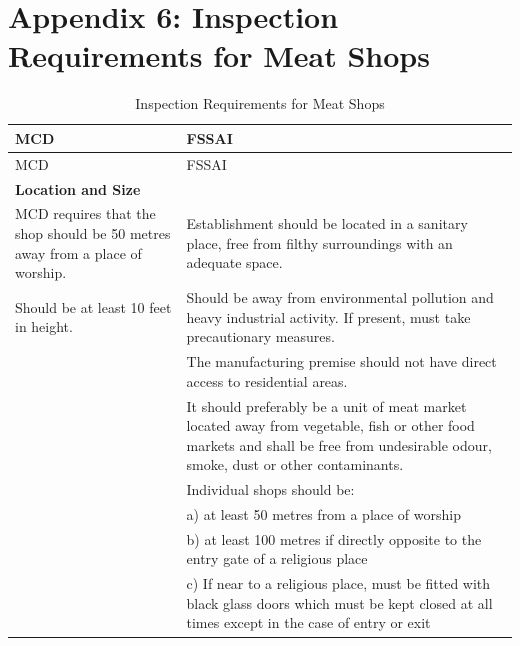 \documentclass[a4paper, 12pt, twoside]{article}
\newcommand\tabitem{\makebox[1em][r]{\textbullet~}}
\begin{document}
\newpage
\section*{Appendix 6: Inspection Requirements for Meat Shops}
\begin{longtable}[l]{>{\raggedright}p{6.5cm}>{\raggedright\arraybackslash}p{8.5cm}}
\caption{Inspection Requirements for Meat Shops} \\
\endfirsthead
\toprule
MCD & FSSAI\\
\midrule
\endhead
\midrule
MCD & FSSAI\\
\midrule
\textbf{Location and Size}	&	 \\
    \midrule

	\tabitem MCD requires that the shop should be 50 metres away from a place of worship.	&
	\tabitem Establishment should be located in a sanitary place, free from filthy surroundings with an adequate space.\\
	\newline{} \tabitem Should be at least 10 feet  in height.		&
	\newline{}\tabitem Should be away from environmental pollution and heavy industrial activity. If present, must take precautionary measures.	\\
		&	\newline{} \tabitem The manufacturing premise should not have direct access to residential areas.\\
	&	\newline{} \tabitem It should preferably be a unit of meat market located away from vegetable, fish or other food markets and shall be free from undesirable odour, smoke, dust or other contaminants.\\
		&	\newline{} \tabitem Individual shops should be:\\
		&	\newline{}   a) at least 50 metres from a place of worship\\
		&	\newline{}  b) at least 100 metres if directly opposite to the entry gate of a religious place\\
		&	\newline{}  c) If near to a religious place, must be fitted with black glass doors which must be kept closed at all times except in the case of entry or exit\\

\end{longtable}
\end{document}
